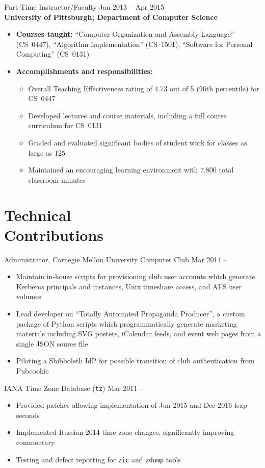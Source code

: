 \documentclass[11pt]{article}
\newcommand{\textdb}[1]{\fontseries{db}\selectfont#1\normalfont}
\newcommand{\present}{\phantom{Xxx 20XX}}
\begin{document}
\textdb{
Part-Time Instructor/Faculty
	\hfill Jan 2013 -- Apr 2015 \\
}
\textbf{University of Pittsburgh; Department of Computer Science}
\begin{itemize}
	\item \textbf{Courses taught:}
		``Computer Organization and Assembly Language'' (CS~0447),
		``Algorithm Implementation'' (CS~1501),
		``Software for Personal Computing'' (CS~0131)
	\item \textbf{Accomplishments and responsibilities:}
		\begin{itemize}
			\item Overall Teaching Effectiveness rating of 4.73 out of 5
				(96th percentile) for CS~0447
			\item Developed lectures and course materials,
				including a full course curriculum for CS~0131
			\item Graded and evaluated significant bodies of student work
				for classes as large as 125
			\item Maintained an encouraging learning environment
				with 7,800 total classroom minutes
		\end{itemize}
\end{itemize}



\section{Technical\\ Contributions}

\textdb{
Administrator, Carnegie Mellon University Computer Club
	\hfill Mar 2014 -- \present
}
\begin{itemize}
	\item Maintain in-house scripts for provisioning club user accounts
		which generate Kerberos principals and instances,
		Unix timeshare access, and AFS user volumes
	\item Lead developer on ``Totally Automated Propaganda Producer'',
		a custom package of Python scripts
		which programmatically generate marketing materials
		including SVG posters, iCalendar feeds, and event web pages
		from a single JSON source file
	\item Piloting a Shibboleth IdP for possible transition
		of club authentication from Pubcookie
\end{itemize}

\textdb{
IANA Time Zone Database (\texttt{tz})
	\hfill Mar 2011 -- \present
}
\begin{itemize}
	\item Provided patches allowing implementation of Jun 2015 and Dec 2016 leap seconds
	\item Implemented Russian 2014 time zone changes,
		significantly improving commentary
	\item Testing and defect reporting for \texttt{zic} and \texttt{zdump} tools
\end{itemize}
\end{document}
